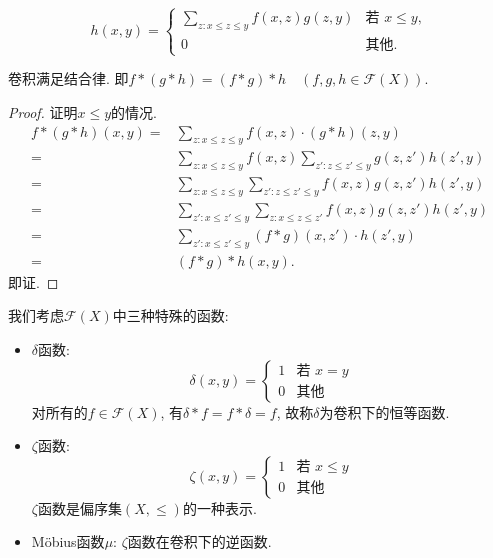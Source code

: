 \[ h(x, y) = \begin{cases}
        \sum_{z : x \leq z \leq y} f(x, z) g(z, y) & \text{若 } x \leq y, \\
        0                                          & \text{其他.}
    \end{cases} \]
\begin{lemma}\label{juanjijiehel}
    卷积满足结合律. 即$f * (g * h) = (f * g) * h \quad (f, g, h \in \mathcal{F}(X))$.
\end{lemma}
\begin{proof}证明$x\leq y$的情况.
    \begin{align*}
        f*(g*h)(x,y)= & \sum_{z:x\leq z\leq y}f(x,z)\cdot (g*h)(z,y)                        \\
        =             & \sum_{z:x\leq z\leq y}f(x,z)\sum_{z':z\leq z'\leq y}g(z,z')h(z',y)  \\
        =             & \sum_{z:x\leq z\leq y}\sum_{z':z\leq z'\leq y}f(x,z)g(z,z')h(z',y)  \\
        =             & \sum_{z':x\leq z'\leq y}\sum_{z:x\leq z\leq z'}f(x,z)g(z,z')h(z',y) \\
        =             & \sum_{z':x\leq z'\leq y}(f*g)(x,z')\cdot h(z',y)                    \\
        =             & (f * g) * h(x,y).
    \end{align*}
    即证.
\end{proof}

我们考虑$\mathcal{F}(X)$中三种特殊的函数:
\begin{itemize}
    \item $\delta$函数: $$\delta(x, y) =
              \begin{cases}
                  1 & \text{若 } x = y \\
                  0 & \text{其他}
              \end{cases}$$
              对所有的$f\in \mathcal{F}(X)$, 有$\delta*f=f*\delta=f$, 故称$\delta$为卷积下的恒等函数.
    \item $\zeta$函数: $$\zeta(x, y) =
              \begin{cases}
                  1 & \text{若 } x \leq y \\
                  0 & \text{其他}
              \end{cases}$$
              $\zeta$函数是偏序集$(X,\leq)$的一种表示.
    \item Möbius函数$\mu$: $\zeta$函数在卷积下的逆函数.
\end{itemize}

